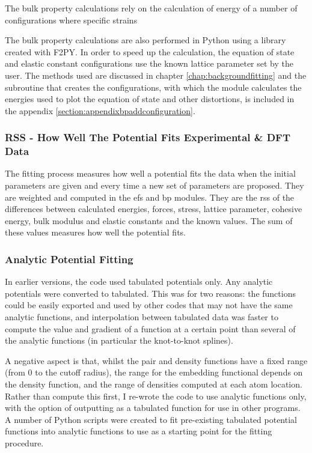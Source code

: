 The bulk property calculations rely on the calculation of energy of a number of configurations where specific strains


The bulk property calculations are also performed in Python using a library created with F2PY.  In order to speed up the calculation, the equation of state and elastic constant configurations use the known lattice parameter set by the user.  The methods used are discussed in chapter \ref{chap:backgroundfitting} and the subroutine that creates the configurations, with which the module calculates the energies used to plot the equation of state and other distortions, is included in the appendix \ref{section:appendixbpaddconfiguration}.


\subsubsection{RSS - How Well The Potential Fits Experimental \& DFT Data}

The fitting process measures how well a potential fits the data when the initial parameters are given and every time a new set of parameters are proposed.  They are weighted and computed in the efs and bp modules.  They are the \acrfull{rss} of the differences between calculated energies, forces, stress, lattice parameter, cohesive energy, bulk modulus and elastic constants and the known values.  The sum of these values measures how well the potential fits.


\subsubsection{Analytic Potential Fitting}

In earlier versions, the code used tabulated potentials only.  Any analytic potentials were converted to tabulated.  This was for two reasons: the functions could be easily exported and used by other codes that may not have the same analytic functions, and interpolation between tabulated data was faster to compute the value and gradient of a function at a certain point than several of the analytic functions (in particular the knot-to-knot splines).  

A negative aspect is that, whilst the pair and density functions have a fixed range (from 0 to the cutoff radius), the range for the embedding functional depends on the density function, and the range of densities computed at each atom location.  Rather than compute this first, I re-wrote the code to use analytic functions only, with the option of outputting as a tabulated function for use in other programs.  A number of Python scripts were created to fit pre-existing tabulated potential functions into analytic functions to use as a starting point for the fitting procedure.

